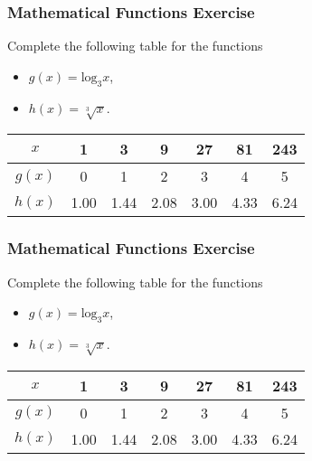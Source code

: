 \documentclass{beamer}
\begin{document}
\begin{frame}
\frametitle{Mathematical Functions Exercise}
\LARGE
Complete the following table for the functions 
\begin{itemize}
\item $g(x) = \mbox{log}_3x$,
\item $h(x) =\sqrt[3]{x}$.
\end{itemize} 
\begin{center}
\LARGE
\begin{tabular}{|c||c|c|c|c|c|c|}
\hline $x$ & 1	&	3	&	9	&	27	&	81	&	243	\\ \hline
\phantom{p} $g(x)$ \phantom{p}&0	&	1	&	2	&	3	&	4	&	5	\\ \hline
\phantom{p}$h(x)$ \phantom{p}&  1.00	&	1.44	&	2.08	&	3.00	&	4.33	&	6.24	\\ \hline
\end{tabular} 
\end{center}
\Large
\end{frame}
\begin{frame}
\frametitle{Mathematical Functions Exercise}
\LARGE
Complete the following table for the functions 
\begin{itemize}
\item $g(x) = \mbox{log}_3x$,
\item $h(x) =\sqrt[3]{x}$.
\end{itemize} 
\begin{center}
\LARGE
\begin{tabular}{|c||c|c|c|c|c|c|}
\hline $x$ & 1	&	3	&	9	&	27	&	81	&	243	\\ \hline
\phantom{p} $g(x)$ \phantom{p}&0	&	1	&	2	&	3	&	4	&	5	\\ \hline
\phantom{p}$h(x)$ \phantom{p}&  1.00	&	1.44	&	2.08	&	3.00	&	4.33	&	6.24	\\ \hline
\end{tabular} 
\end{center}
\Large
\end{frame}
\end{document}
